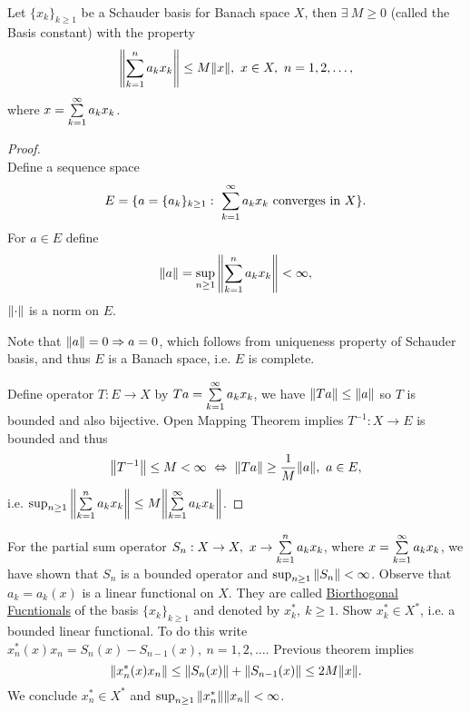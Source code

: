 \vspace{3pt}
\begin{theorem}\ \\
Let $\{x_k\}_{k \geq 1}$ be a Schauder basis for Banach space $X$, then $\exists\ M \geq 0$ (called the Basis constant) with the property
\begin{equation*}
    \norm{\sum\limits_{k=1}^{n} a_k x_k} \leq M \norm{x},\ x \in X,\ n = 1,2,\dots,
\end{equation*}
where $x = \sum\limits_{k=1}^{\infty} a_k x_k$.
\end{theorem}
\begin{proof}\ \\
Define a sequence space
\begin{equation*}
    E = \{a = \{a_k\}_{k \geq 1}:\ \sum\limits_{k=1}^{\infty} a_k x_k \text{ converges in } X\}.
\end{equation*}
For $a \in E$ define 
\begin{equation*}
    \norm{a} = \sup_{n \geq 1} \norm{\sum\limits_{k=1}^{n} a_k x_k} < \infty,
\end{equation*}
$\norm{\cdot}$ is a norm on $E$.

\np Note that $\norm{a} = 0 \Rightarrow a = 0$, which follows from uniqueness property of Schauder basis, and thus $E$ is a Banach space, i.e. $E$ is complete.

\np Define operator $T: E \to X$ by $Ta = \sum\limits_{k=1}^{\infty} a_k x_k$, we have $\norm{Ta} \leq \norm{a}$ so $T$ is bounded and also bijective. Open Mapping Theorem implies $T^{-1}: X \to E$ is bounded and thus
\begin{equation*}
    \norm{T^{-1}} \leq M < \infty\ \Leftrightarrow\ \norm{Ta} \geq \frac{1}{M} \norm{a},\ a \in E,
\end{equation*}
i.e. $\sup_{n \geq 1} \norm{\sum\limits_{k=1}^{n} a_k x_k} \leq M \norm{\sum\limits_{k=1}^{\infty} a_k x_k}$.
\end{proof}


\np For the partial sum operator $S_n: X \to X,\ x \to \sum\limits_{k=1}^{n} a_k x_k$, where $x = \sum\limits_{k=1}^{\infty} a_k x_k$, we have shown that $S_n$ is a bounded operator and $\sup_{n \geq 1} \norm{S_n} < \infty$. Observe that $a_k = a_k(x)$ is a linear functional on $X$. They are called \underline{Biorthogonal Fucntionals} of the basis $\{x_k\}_{k \geq 1}$ and denoted by $x_k^*,\ k \geq 1$. Show $x_k^* \in X^*$, i.e. a bounded linear functional.  To do this write $x_n^*(x) x_n = S_n(x) - S_{n-1}(x),\ n = 1,2,\dots$. Previous theorem implies
\begin{equation*}
    \norm{x_n^*(x) x_n} \leq \norm{S_n(x)} + \norm{S_{n-1}(x)} \leq 2M \norm{x}.
\end{equation*}
We conclude $x_n^* \in X^*$ and $\sup_{n \geq 1} \norm{x_n^*} \norm{x_n} < \infty$. 

